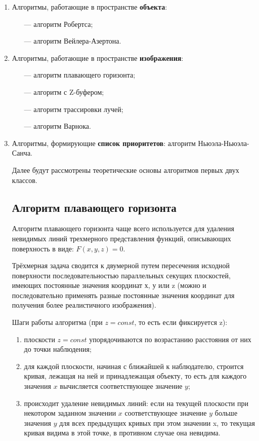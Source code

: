 \begin{enumerate}
	\item Алгоритмы, работающие в пространстве \textbf{объекта}: 
		\begin{itemize}
			\item[---] алгоритм Робертса;
			\item[---] алгоритм Вейлера-Азертона.
		\end{itemize}
	\item Алгоритмы, работающие в пространстве \textbf{изображения}: 
		\begin{itemize}
			\item[---] алгоритм плавающего горизонта;
			\item[---] алгоритм с Z-буфером;
			\item[---] алгоритм трассировки лучей;
			\item[---] алгоритм Варнока.
		\end{itemize}
	\item Алгоритмы, формирующие \textbf{список приоритетов}: алгоритм Ньюэла-Ньюэла-Санча.

Далее будут рассмотрены теоретические основы алгоритмов первых двух классов.

\subsection{Алгоритм плавающего горизонта}

Алгоритм плавающего горизонта чаще всего используется для удаления невидимых линий трехмерного представления функций, описывающих поверхность в виде: $F(x, y, z) = 0$.

Трёхмерная задача сводится к двумерной путем пересечения исходной поверхности последовательностью параллельных секущих плоскостей, имеющих постоянные значения координат х, у или z (можно и последовательно применять разные постоянные значения координат для получения более реалистичного изображения). 

Шаги работы алгоритма (при $z=const$, то есть если фиксируется z):
\begin{enumerate}
	\item плоскости $z=const$ упорядочиваются по возрастанию расстояния от них до точки наблюдения;
	\item для каждой плоскости, начиная с ближайшей к наблюдателю, строится кривая, лежащая на ней и принадлежащая объекту, то есть для каждого значения $x$ вычисляется соответствующее значение $y$;
	\item происходит удаление невидимых линий: если на текущей плоскости при некотором заданном значении $x$ соответствующее значение $y$ больше значения $y$ для всех предыдущих кривых при этом значении x, то текущая кривая видима в этой точке, в противном случае она невидима.
\end{enumerate}


\end{enumerate}
